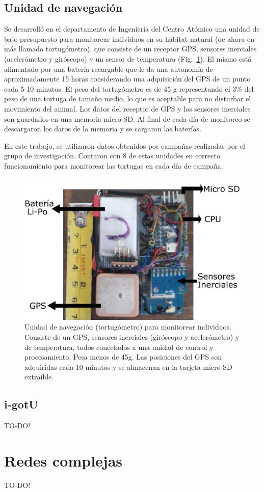 \subsection{Unidad de navegación}
Se desarrolló en el departamento de Ingeniería del Centro Atómico  una unidad de bajo presupuesto para monitorear individuos en su hábitat natural (de ahora en más llamado tortugómetro), que consiste de un receptor GPS, sensores inerciales (acelerómetro y giróscopo) y un sensor de temperatura (Fig.~\ref{fig:tortugometro}). El mismo está alimentado por una batería recargable que le da una autonomía de aproximadamente 15 horas considerando una adquisición del GPS de un punto cada 5-10 minutos. El peso del tortugómetro es de 45 g representando el 3\% del peso de una tortuga de tamaño medio, lo que es aceptable para no disturbar el movimiento del animal. Los datos del receptor de GPS y los sensores inerciales son guardados en una memoria micro-SD. Al final de cada día de monitoreo se descargaron los datos de la memoria y se cargaron las baterías.
 
En este trabajo, se utilizaron datos obtenidos por campañas realizadas por el grupo de investigación. Contaron con 8 de estas unidades en correcto funcionamiento para monitorear las tortugas en cada día de campaña.
\begin{figure}[h]
    \includegraphics[width=\imsize]{figs/Chap1/tortugometro.pdf}  
    \caption[Unidad de navegación (tortugómetro) para monitorear individuos.] {Unidad de navegación (tortugómetro) para monitorear individuos. Consiste de un GPS, sensores inerciales (giróscopo y acelerómetro) y de temperatura, todos conectados a una unidad de control y procesamiento. Pesa menos de 45g. Las posiciones del GPS son adquiridas cada 10 minutos y se almacenan en la tarjeta micro SD extraíble. }
    \label{fig:tortugometro}
\end{figure}

\subsection{i-gotU}
\begin{huge}
TO-DO!
\end{huge}
\section{Redes complejas}
\begin{huge}
    TO-DO!
\end{huge}



